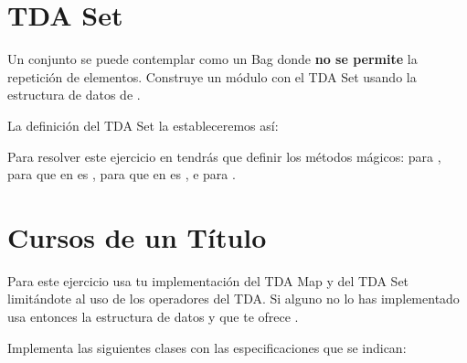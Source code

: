 \separacion
\section{TDA Set}


Un conjunto se puede contemplar como un Bag donde \textbf{no se permite} la repetición de elementos. Construye un módulo con el TDA Set usando la estructura de datos  de .


La definición del TDA Set la estableceremos así:





Para resolver este ejercicio en  tendrás que definir los métodos mágicos:
 para ,  para  que en  es ,  para  que en  es \cm{==}, e  para .

\separacion
\section{Cursos de un Título}\label{sec:cursosDeTitulo}

Para este ejercicio usa tu implementación del TDA Map y del TDA Set limitándote al uso de los operadores del TDA. Si alguno no lo has implementado usa entonces la estructura de datos  y  que te ofrece .

Implementa las siguientes clases con las especificaciones que se indican:

